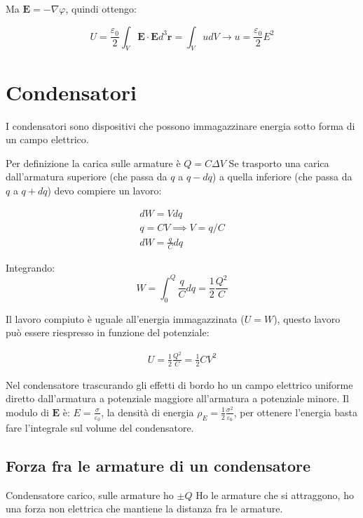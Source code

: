 \documentclass[a4paper]{scrarticle}
\begin{document}
Ma $\bm E = - \nabla \varphi$, quindi ottengo:

\begin{equation}
    U = \frac{\varepsilon_0}{2} \int_V \bm E \cdot \bm E d^3 \bm r = \int_V u dV \to u = \frac{\varepsilon_0}{2}E^2
\end{equation}

\section{Condensatori}

I condensatori sono dispositivi che possono immagazzinare energia sotto forma di un campo elettrico.

Per definizione la carica sulle armature è $Q = C \Delta V $
Se trasporto una carica dall'armatura superiore (che passa da $q$ a $q - dq$) a quella inferiore (che passa da $q$ a $q + dq$) devo compiere un lavoro:

\begin{gather*}
    dW = V dq\\
    q = CV\implies V = q/C \\
    dW = \frac{q}{C} dq    
\end{gather*}

Integrando:
\begin{equation}
    W = \int_{0}^{Q} \frac{q}{C} dq = \frac{1}{2}\frac{Q^2}{C}
\end{equation}

Il lavoro compiuto è uguale all'energia immagazzinata ($U  = W$), questo lavoro può essere riespresso in funzione del potenziale:

\begin{gather*}
    U = \frac{1}{2} \frac{Q^2}{C} = \frac{1}{2} CV^2
\end{gather*}

Nel condensatore trascurando gli effetti di bordo ho un campo elettrico uniforme diretto dall'armatura a potenziale maggiore all'armatura a potenziale minore.
Il modulo di $\bm E$ è: $E = \frac{\sigma}{\varepsilon_0}$, la densità di energia $\rho_E = \frac{1}{2}\frac{\sigma^2}{\varepsilon_0}$, per ottenere l'energia basta fare l'integrale sul volume del condensatore.

\subsection{Forza fra le armature di un condensatore}

Condensatore carico, sulle armature ho $\pm Q$
Ho le armature che si attraggono, ho una forza non elettrica che mantiene la distanza fra le armature.
\end{document}
